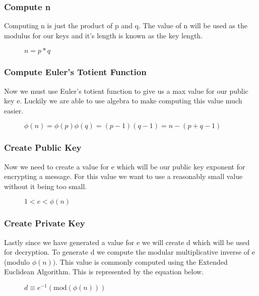 \documentclass[conference]{IEEEtran}
\begin{document}
\subsubsection{Compute n}
Computing n is just the product of p and q. The value of n will be used as the modulus for our keys and it's length is known as the key length.

\begin{figure}[h]
	\begin{center}
		$n=p * q$
	\end{center}
\end{figure}

\subsubsection{Compute Euler's Totient Function}
Now we must use Euler's totient function to give us a max value for our public key e.
Luckily we are able to use algebra to make computing this value much easier.
\begin{figure}[h]
	\begin{center}
		$\phi \left(n\right)=\phi \left(p\right)\phi \left(q\right)=\left(p-1\right)\left(q-1\right)=n-\left(p+q-1\right)$
	\end{center}
\end{figure}

\subsubsection{Create Public Key}
Now we need to create a value for e which will be our public key exponent for encrypting a message. For this value we want to use a reasonably small value without it being too small. 
\begin{figure}[h]
	\begin{center}
		$1 < e < \phi \left(n\right)$
	\end{center}
\end{figure}
\subsubsection{Create Private Key}
Lastly since we have generated a value for e we will create d which will be used for decryption. To generate d we compute the modular multiplicative inverse of e (modulo $ \phi \left(n\right))$. This value is commonly computed using the Extended Euclidean Algorithm. This is represented by the equation below.
\begin{figure}[h]
	\begin{center}
		$d\equiv {e}^{-1}\left(\mathrm{mod}\left(\phi \left(n\right)\right)\right)$
	\end{center}
\end{figure}
\end{document}
